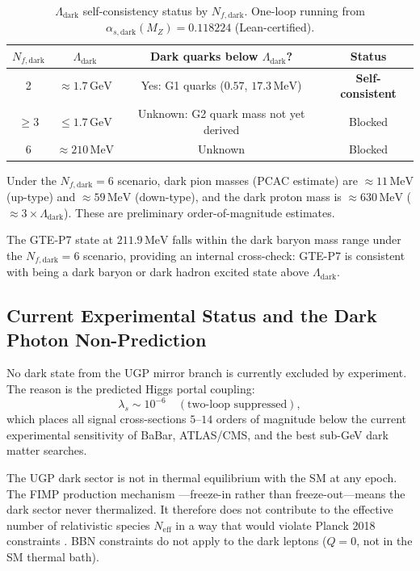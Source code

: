 \documentclass[11pt]{article}
\begin{document}
\begin{table}[ht]
\centering
\caption{$\Lambda_\mathrm{dark}$ self-consistency status by $N_{f,\mathrm{dark}}$.
One-loop running from $\alpha_{s,\mathrm{dark}}(M_Z)=0.118224$ (Lean-certified).}
\label{tab:lambda_dark_nf}
\begin{tabular}{cccc}
\hline
$N_{f,\mathrm{dark}}$ & $\Lambda_\mathrm{dark}$ & Dark quarks below $\Lambda_\mathrm{dark}$? & Status \\
\hline
2 & $\approx 1.7\,\mathrm{GeV}$ & Yes: G1 quarks ($0.57$, $17.3\,\mathrm{MeV}$) & \textbf{Self-consistent} \\
$\geq 3$ & $\leq 1.7\,\mathrm{GeV}$ & Unknown: G2 quark mass not yet derived & Blocked \\
6 & $\approx 210\,\mathrm{MeV}$ & Unknown & Blocked \\
\hline
\end{tabular}
\end{table}

Under the $N_{f,\mathrm{dark}}=6$ scenario, dark pion masses (PCAC estimate) are
$\approx 11\,\mathrm{MeV}$ (up-type) and $\approx 59\,\mathrm{MeV}$ (down-type), and
the dark proton mass is $\approx 630\,\mathrm{MeV}$ ($\approx 3\times \Lambda_\mathrm{dark}$).
These are preliminary order-of-magnitude estimates.

The GTE-P7 state at $211.9\,\mathrm{MeV}$ \cite{SpivackGTESpectrum} falls within
the dark baryon mass range under the $N_{f,\mathrm{dark}}=6$ scenario, providing an
internal cross-check: GTE-P7 is consistent with being a dark baryon or dark hadron
excited state above $\Lambda_\mathrm{dark}$.

\subsection{Current Experimental Status and the Dark Photon Non-Prediction}
\label{ssec:exp_status}

No dark state from the UGP mirror branch is currently excluded by experiment. The
reason is the predicted Higgs portal coupling:
\begin{equation}
\lambda_s \sim 10^{-6} \quad (\text{two-loop suppressed}),
\label{eq:higgs_portal}
\end{equation}
which places all signal cross-sections $5$--$14$ orders of magnitude below the current
experimental sensitivity of BaBar, ATLAS/CMS, and the best sub-GeV dark matter searches.

The UGP dark sector is not in thermal equilibrium with the SM at any epoch. The FIMP
production mechanism \cite{McDonald2002,HallFIMP2010}---freeze-in rather than
freeze-out---means the dark sector never thermalized. It therefore does not contribute to
the effective number of relativistic species $N_\mathrm{eff}$ in a way that would violate
Planck 2018 constraints \cite{Planck2018}. BBN constraints do not apply to the dark
leptons ($Q=0$, not in the SM thermal bath).
\end{document}
